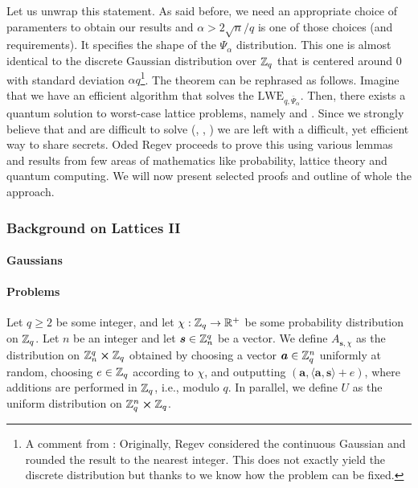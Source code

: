 Let us unwrap this statement. As said before, we need an appropriate choice of paramenters to obtain our results and $\alpha > 2\sqrt{n}/q$ is one of those choices (and requirements). It specifies the shape of the $\Psi_{\alpha}$ distribution. This one is almost identical to the discrete Gaussian distribution over $\mathbb{Z}_q$ that is centered around 0 with standard deviation $\alpha q$\footnote{A comment from \cite{lattice-survey}: Originally, Regev considered the continuous Gaussian and rounded the result to the nearest integer. This does not exactly yield the discrete distribution but thanks to \cite{discr} we know how the problem can be fixed.}. The theorem can be rephrased as follows. Imagine that we have an efficient algorithm that solves the $\text{LWE}_{q, \bar{\Psi}_{\alpha}}$. Then, there exists a quantum solution to worst-case lattice problems, namely  and . Since we strongly believe that  and  are difficult to solve (\cite{svp-hard}, \cite{reductions}, \cite{cvp-hard}) we are left with a difficult, yet efficient way to share secrets. Oded Regev proceeds to prove this using various lemmas and results from few areas of mathematics like probability, lattice theory and quantum computing. We will now present selected proofs and outline of whole the approach.

\subsubsection{Background on Lattices II}
\paragraph{Gaussians}
\begin{definition}
\end{definition}
\paragraph{Problems}
\begin{definition}
\end{definition}
\begin{definition}
\end{definition}
\begin{definition}\label{lwe-distr}
    Let $q \geq 2$ be some integer, and let $\chi : \mathbb{Z}_q \rightarrow \mathbb{R}^+$ be some probability distribution on $\mathbb{Z}_q$. Let $n$ be an integer and let $\boldsymbol{s} \in \mathbb{Z}_n^q$ be a vector. We define $A_{\bm{s},\chi}$ as the distribution on $\mathbb{Z}_n^q \cross \mathbb{Z}_q$ obtained by choosing a vector $\boldsymbol{a} \in \mathbb{Z}_q^n$ uniformly at random, choosing $e \in \mathbb{Z}_q$ according to $\chi$, and outputting $(\bm{a}, \langle \bm{a}, \bm{s} \rangle + e)$, where additions are performed in $\mathbb{Z}_q$, i.e., modulo $q$. In parallel, we define $U$ as the uniform distribution on $\mathbb{Z}_q^n \cross \mathbb{Z}_q$.
\end{definition}
\begin{definition}\label{dgs}
\end{definition}
